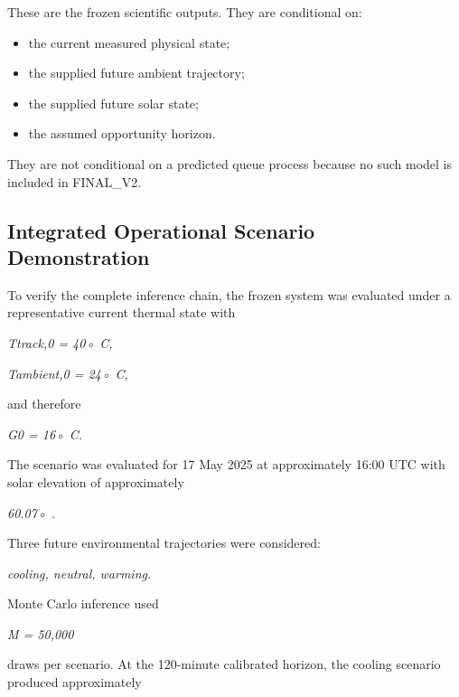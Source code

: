 These are the frozen scientific outputs. They are conditional on:

\begin{itemize}
\item the current measured physical state;
\item the supplied future ambient trajectory;
\item the supplied future solar state;
\item the assumed opportunity horizon.
\end{itemize}

They are not conditional on a predicted queue process because no such model is included in FINAL\_V2.

\subsection{Integrated Operational Scenario Demonstration}
To verify the complete inference chain, the frozen system was evaluated under a representative current thermal state with

\begin{center}\textit{Ttrack,0 = 40◦ C,}\end{center}

\begin{center}\textit{Tambient,0 = 24◦ C,}\end{center}

and therefore

\begin{center}\textit{G0 = 16◦ C.}\end{center}

The scenario was evaluated for 17 May 2025 at approximately 16:00 UTC with solar elevation of approximately

\begin{center}\textit{60.07◦ .}\end{center}

Three future environmental trajectories were considered:

\begin{center}\textit{cooling,       neutral,         warming.}\end{center}

Monte Carlo inference used

\begin{center}\textit{M = 50,000}\end{center}

draws per scenario. At the 120-minute calibrated horizon, the cooling scenario produced approximately

